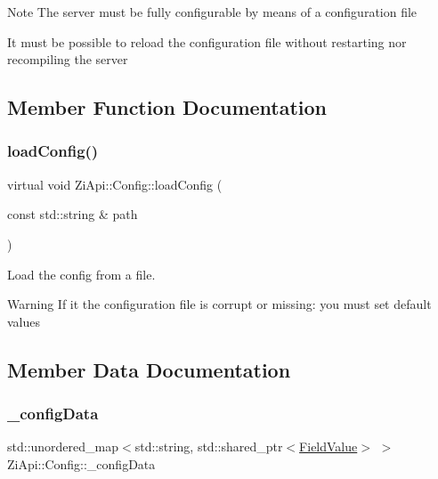\begin{DoxyNote}{Note}
The server must be fully configurable by means of a configuration file 

It must be possible to reload the configuration file without restarting nor recompiling the server 
\end{DoxyNote}


\subsection{Member Function Documentation}
\mbox{\label{classZiApi_1_1Config_adea7c918bc9802e935a76bc525d5c898}} 
\subsubsection{\texorpdfstring{loadConfig()}{loadConfig()}}
{\footnotesize\ttfamily virtual void Zi\+Api\+::\+Config\+::load\+Config (\begin{DoxyParamCaption}\item[{const std\+::string \&}]{path }\end{DoxyParamCaption})\hspace{0.3cm}{\ttfamily [pure virtual]}}



Load the config from a file. 

\begin{DoxyWarning}{Warning}
If it the configuration file is corrupt or missing\+: you must set default values 
\end{DoxyWarning}


\subsection{Member Data Documentation}
\mbox{\label{classZiApi_1_1Config_a8f6f6b90cf9a3f5952b707a6f0da17a8}} 
\subsubsection{\texorpdfstring{\_configData}{\_configData}}
{\footnotesize\ttfamily std\+::unordered\+\_\+map$<$std\+::string, std\+::shared\+\_\+ptr$<$\mbox{\hyperlink{classZiApi_1_1FieldValue}{Field\+Value}}$>$ $>$ Zi\+Api\+::\+Config\+::\+\_\+config\+Data\hspace{0.3cm}{\ttfamily [protected]}}



